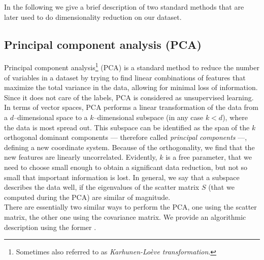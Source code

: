 In the following we give a brief description of two standard methods that are later used to do dimensionality reduction on our dataset.

\subsection{Principal component analysis (PCA)}
\label{sec:theory:pca}

Principal component analysis\footnote{Sometimes also referred to as \emph{Karhunen-Loève transformation}.} (PCA) is a standard method to reduce the number of variables in a dataset by trying to find linear combinations of features that maximize the total variance in the data, allowing for minimal loss of information. Since it does not care of the labels, PCA is considered as unsupervised learning. In terms of vector spaces, PCA performs a linear transformation of the data from a $d$--dimensional space to a $k$--dimensional subspace (in any case $k < d$), where the data is most spread out. This subspace can be identified as the span of the $k$ orthogonal dominant components --- therefore called \emph{principal components} ---, defining a new coordinate system. Because of the orthogonality, we find that the new features are linearly uncorrelated. Evidently, $k$ is a free parameter, that we need to choose small enough to obtain a significant data reduction, but not so small that important information is lost. In general, we say that a subspace describes the data well, if the eigenvalues of the scatter matrix $S$ (that we computed during the PCA) are similar of magnitude.\\

There are essentially two similar ways to perform the PCA, one using the scatter matrix, the other one using the covariance matrix. We provide an algorithmic description using the former \citep{duda2001}.

